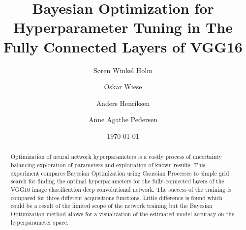 \documentclass[12pt,fleqn]{article}
\title{\vspace*{-3.75cm}Bayesian Optimization for Hyperparameter Tuning in The Fully Connected Layers of VGG16}
\author{Søren Winkel Holm\and Oskar Wiese\and Anders Henriksen\and Anne Agathe Pedersen}
\date{\today}
\begin{document}
\maketitle


\begin{abstract}
\noindent Optimization of neural network hyperparameters is a costly process of uncertainty balancing exploration of parameters and exploitation of known results. This experiment compares Bayesian Optimization using Gaussian Processes to  simple grid search for finding the optimal hyperparameters for the fully-connected layers of the VGG16 image classification deep convolutional network. The success of the training is compared for three different acquisitions functions. Little difference is found which could be a result of the limited scope of the network training but the Bayesian Optimization method allows for a visualization of the estimated model accuracy on the hyperparameter space.

\end{abstract}
\end{document}
